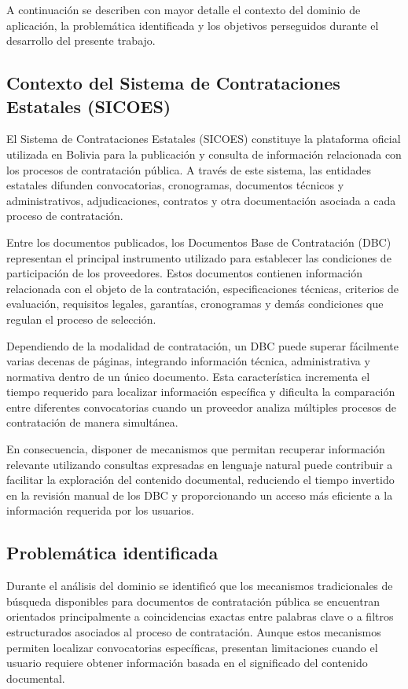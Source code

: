 A continuación se describen con mayor detalle el contexto del dominio de aplicación, la problemática identificada y los objetivos perseguidos durante el desarrollo del presente trabajo.

\subsection{Contexto del Sistema de Contrataciones Estatales (SICOES)}

El Sistema de Contrataciones Estatales (SICOES) constituye la plataforma oficial utilizada en Bolivia para la publicación y consulta de información relacionada con los procesos de contratación pública. A través de este sistema, las entidades estatales difunden convocatorias, cronogramas, documentos técnicos y administrativos, adjudicaciones, contratos y otra documentación asociada a cada proceso de contratación.

Entre los documentos publicados, los Documentos Base de Contratación (DBC) representan el principal instrumento utilizado para establecer las condiciones de participación de los proveedores. Estos documentos contienen información relacionada con el objeto de la contratación, especificaciones técnicas, criterios de evaluación, requisitos legales, garantías, cronogramas y demás condiciones que regulan el proceso de selección.

Dependiendo de la modalidad de contratación, un DBC puede superar fácilmente varias decenas de páginas, integrando información técnica, administrativa y normativa dentro de un único documento. Esta característica incrementa el tiempo requerido para localizar información específica y dificulta la comparación entre diferentes convocatorias cuando un proveedor analiza múltiples procesos de contratación de manera simultánea.

En consecuencia, disponer de mecanismos que permitan recuperar información relevante utilizando consultas expresadas en lenguaje natural puede contribuir a facilitar la exploración del contenido documental, reduciendo el tiempo invertido en la revisión manual de los DBC y proporcionando un acceso más eficiente a la información requerida por los usuarios.

\subsection{Problemática identificada}

Durante el análisis del dominio se identificó que los mecanismos tradicionales de búsqueda disponibles para documentos de contratación pública se encuentran orientados principalmente a coincidencias exactas entre palabras clave o a filtros estructurados asociados al proceso de contratación. Aunque estos mecanismos permiten localizar convocatorias específicas, presentan limitaciones cuando el usuario requiere obtener información basada en el significado del contenido documental.

